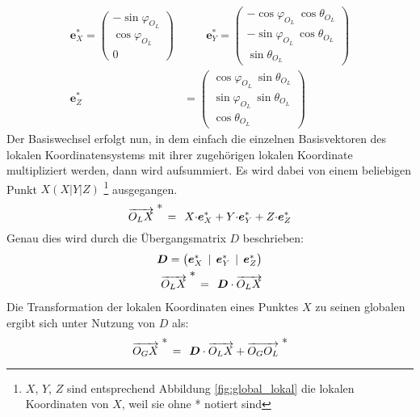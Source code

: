 \begin{equation}
\begin{aligned}
	\boldsymbol{e}_X^* = \begin{pmatrix}-\sin\varphi_{O_L}\\ \cos\varphi_{O_L}\\ 0\end{pmatrix}
	&\qquad
	\boldsymbol{e}_Y^* = \begin{pmatrix}-\cos\varphi_{O_L}\:\cos\theta_{O_L}\\ -\sin\varphi_{O_L}\:\cos\theta_{O_L}\\ \sin\theta_{O_L}\end{pmatrix}\\
	\boldsymbol{e}_Z^* &= \begin{pmatrix}\cos\varphi_{O_L}\:\sin\theta_{O_L}\\ \sin\varphi_{O_L}\:\sin\theta_{O_L}\\ \cos\theta_{O_L}\end{pmatrix}
\end{aligned}
\end{equation}
Der Basiswechsel erfolgt nun, in dem einfach die einzelnen Basisvektoren des lokalen Koordinatensystems mit ihrer zugehörigen lokalen Koordinate multipliziert werden, dann wird aufsummiert. Es wird dabei von einem beliebigen Punkt $X(X|Y|Z)$ \footnote{$X$, $Y$, $Z$ sind entsprechend Abbildung \ref{fig:global_lokal} die lokalen Koordinaten von $X$, weil sie ohne * notiert sind} ausgegangen. 
\begin{equation}
	\overrightarrow{O_LX}\mathrel{\raisebox{10pt}{$*$}} \:\:=\:\:  X{\cdot}\boldsymbol{e}_X^* + Y{\cdot}\boldsymbol{e}_Y^* + Z{\cdot}\boldsymbol{e}_Z^*
\end{equation}
Genau dies wird durch die Übergangsmatrix $D$ beschrieben:
\begin{align}
	\boldsymbol{D} = \begin{pmatrix}\boldsymbol{e}_X^* \:\:|\:\: \boldsymbol{e}_Y^* \:\:|\:\: \boldsymbol{e}_Z^*\end{pmatrix}\\
	\overrightarrow{O_LX}\mathrel{\raisebox{10pt}{$*$}} \:\:=\:\: \boldsymbol{D}\cdot\overrightarrow{O_LX}
\end{align}
Die Transformation der lokalen Koordinaten eines Punktes $X$ zu seinen globalen ergibt sich unter Nutzung von $D$ als:
\begin{equation}
	\overrightarrow{O_GX}\mathrel{\raisebox{10pt}{$*$}} \:\:=\:\: \boldsymbol{D}\cdot\overrightarrow{O_LX} + \overrightarrow{O_GO_L}\mathrel{\raisebox{10pt}{$*$}}
\end{equation}

